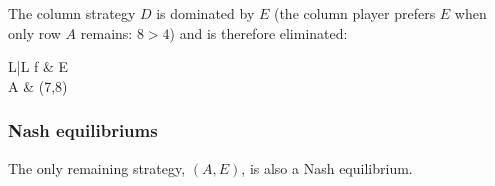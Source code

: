 \documentclass[\main/main.tex]{subfiles}
\begin{document}
The column strategy $D$ is dominated by $E$ (the column player prefers $E$ when only row $A$ remains: $8>4$) and is therefore eliminated:

\begin{table}
  \begin{tabular}{L|L}
    f & E     \\
    \hline
    A & (7,8) \\
  \end{tabular}
\end{table}


\subsubsection*{Nash equilibriums}
The only remaining strategy, $(A,E)$, is also a Nash equilibrium.
\end{document}

